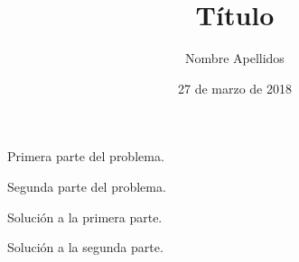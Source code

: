 \documentclass{entrega}
\author{Nombre Apellidos}
\title{Título}
\date{27 de marzo de 2018} %
\begin{document}
\begin{enumproblem}
\item Primera parte del problema.
\item Segunda parte del problema.
\end{enumproblem}

\solution
\begin{enumproblem}
	\item Solución a la primera parte.
	\item Solución a la segunda parte.
\end{enumproblem}
\end{document}
